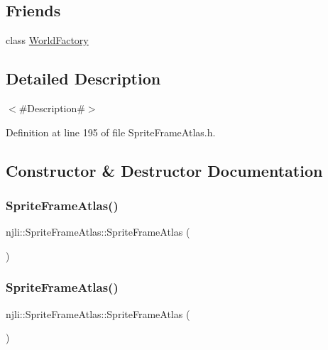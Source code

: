 \subsection*{Friends}
\begin{DoxyCompactItemize}
\item 
class \mbox{\hyperlink{classnjli_1_1_sprite_frame_atlas_acb96ebb09abe8f2a37a915a842babfac}{World\+Factory}}
\end{DoxyCompactItemize}


\subsection{Detailed Description}
$<$\#\+Description\#$>$ 

Definition at line 195 of file Sprite\+Frame\+Atlas.\+h.



\subsection{Constructor \& Destructor Documentation}
\mbox{\label{classnjli_1_1_sprite_frame_atlas_a596bc53daef8f1de21fb018c04b5b71e}} 
\subsubsection{\texorpdfstring{Sprite\+Frame\+Atlas()}{SpriteFrameAtlas()}\hspace{0.1cm}{\footnotesize\ttfamily [1/3]}}
{\footnotesize\ttfamily njli\+::\+Sprite\+Frame\+Atlas\+::\+Sprite\+Frame\+Atlas (\begin{DoxyParamCaption}{ }\end{DoxyParamCaption})\hspace{0.3cm}{\ttfamily [protected]}}

\mbox{\label{classnjli_1_1_sprite_frame_atlas_a15a8fe9a69c63d560897562decfc55e2}} 
\subsubsection{\texorpdfstring{Sprite\+Frame\+Atlas()}{SpriteFrameAtlas()}\hspace{0.1cm}{\footnotesize\ttfamily [2/3]}}
{\footnotesize\ttfamily njli\+::\+Sprite\+Frame\+Atlas\+::\+Sprite\+Frame\+Atlas (\begin{DoxyParamCaption}\item[{const \mbox{\hyperlink{classnjli_1_1_abstract_builder}{Abstract\+Builder}} \&}]{ }\end{DoxyParamCaption})\hspace{0.3cm}{\ttfamily [protected]}}

